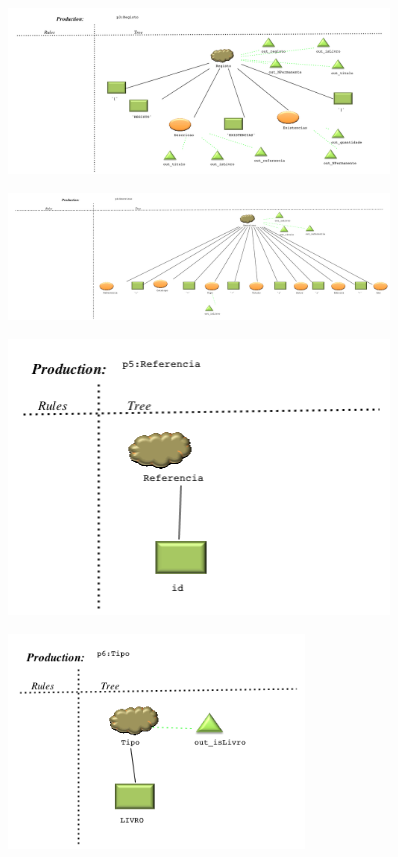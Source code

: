 \begin{figure}[!htb]
  \centering
    \includegraphics[width=0.9\textwidth]{./imagens/VisualLisa/__p3_Registo.png}
\end{figure}
\begin{figure}[!htb]
  \centering
    \includegraphics[width=0.9\textwidth]{./imagens/VisualLisa/__p4_Descricao.png}
\end{figure}
\begin{figure}[!htb]
  \centering
    \includegraphics[width=0.9\textwidth]{./imagens/VisualLisa/__p5_Referencia.png}
\end{figure}
\begin{figure}[!htb]
  \centering
    \includegraphics[width=0.7\textwidth]{./imagens/VisualLisa/__p6_Tipo.png}
\end{figure}
